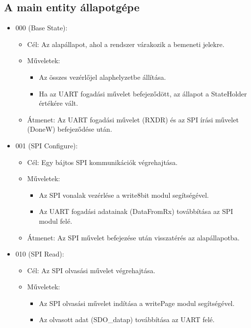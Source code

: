 \documentclass[a4paper,12pt,oneside]{book}
\begin{document}
\subsection{A main entity állapotgépe}
\begin{itemize}
    \item 000 (Base State):
    \begin{itemize}
        \item Cél: Az alapállapot, ahol a rendszer várakozik a bemeneti jelekre.
        \item Műveletek:
        \begin{itemize}
            \item Az összes vezérlőjel alaphelyzetbe állítása.
            \item Ha az UART fogadási művelet befejeződött, az állapot a StateHolder értékére vált.
        \end{itemize}
        \item Átmenet: Az UART fogadási művelet (RXDR) és az SPI írási művelet (DoneW) befejeződése után.
    \end{itemize}
    \item 001 (SPI Configure):
    \begin{itemize}
        \item Cél: Egy bájtos SPI kommunikációk végrehajtása.
        \item Műveletek:
        \begin{itemize}
            \item Az SPI vonalak vezérlése a write8bit modul segítségével.
            \item Az UART fogadási adatainak (DataFromRx) továbbítása az SPI modul felé.
        \end{itemize}
        \item Átmenet: Az SPI művelet befejezése után visszatérés az alapállapotba.
    \end{itemize}
    \item 010 (SPI Read):
    \begin{itemize}
        \item Cél: Az SPI olvasási művelet végrehajtása.
        \item Műveletek:
        \begin{itemize}
            \item Az SPI olvasási művelet indítása a writePage modul segítségével.
            \item Az olvasott adat (SDO\_datap) továbbítása az UART felé.
        \end{itemize}

\end{itemize}
\end{itemize}
\end{document}
